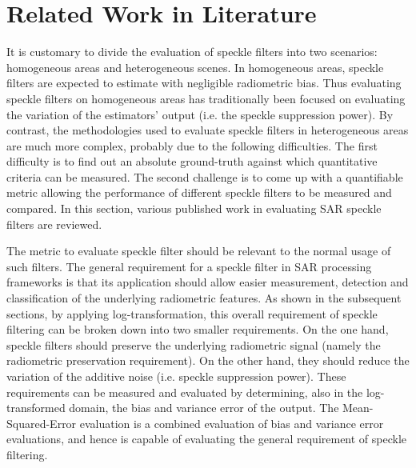 \documentclass[journal]{IEEEtran}
\begin{document}
\section{Related Work in Literature}
\label{sec:lit_review}

It is customary to divide the evaluation of speckle filters into two scenarios:
	homogeneous areas and heterogeneous scenes.
In homogeneous areas,
	speckle filters are expected to estimate with negligible radiometric bias.
Thus evaluating speckle filters on homogeneous areas has traditionally been focused on evaluating the variation of the estimators' output (i.e. the speckle suppression power).
By contrast, the methodologies used to evaluate speckle filters in heterogeneous areas are much more complex, probably due to the following difficulties.
The first difficulty is to find out an absolute ground-truth against which quantitative criteria can be measured.
The second challenge is to come up with a quantifiable metric allowing the performance of different speckle filters to be measured and compared.
In this section, various published work in evaluating SAR speckle filters are reviewed.

The metric to evaluate speckle filter should be relevant to the normal usage of such filters.
The general requirement for a speckle filter in SAR processing frameworks is that its application should allow easier measurement, detection and classification of the underlying radiometric features.
As shown in the subsequent sections, by applying log-transformation, 
	this overall requirement of speckle filtering can be broken down into two smaller requirements.
On the one hand, speckle filters should preserve the underlying radiometric signal (namely the radiometric preservation requirement).
On the other hand, they should reduce the variation of the additive noise (i.e. speckle suppression power).
These requirements can be measured and evaluated by determining, also in the log-transformed domain, the bias and variance error of the output.
The Mean-Squared-Error evaluation is a combined evaluation of bias and variance error evaluations, and hence is capable of evaluating the general requirement of speckle filtering.
\end{document}
